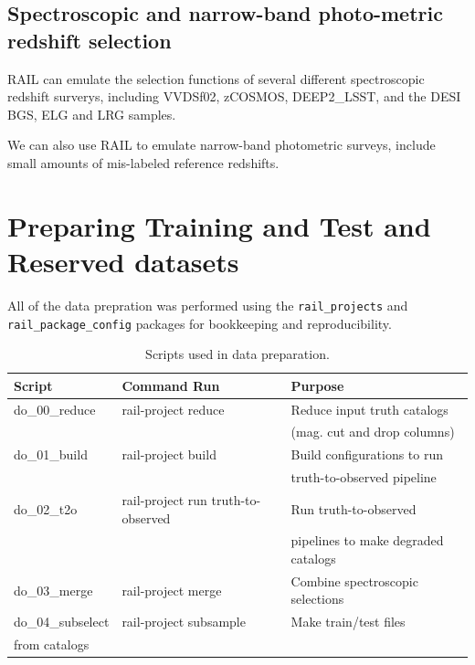 \documentclass[modern]{desc-tex/styles/lsstdescnote}
\begin{document}
\subsection{Spectroscopic and narrow-band photo-metric redshift
  selection}

RAIL can emulate the selection functions of several different
spectroscopic redshift surverys, including VVDSf02, zCOSMOS,
DEEP2\_LSST, and the DESI BGS, ELG and LRG samples.

We can also use RAIL to emulate narrow-band photometric surveys,
include small amounts of mis-labeled reference redshifts.


\section{Preparing Training and Test and Reserved datasets}

All of the data prepration was performed using the
\texttt{rail\_projects} and \texttt{rail\_package\_config} packages
for bookkeeping and reproducibility.

\begin{table}[ht]
\centering
\caption{\label{tab:prep_scripts}\small Scripts used
  in data preparation.}
\begin{tabular}{lll}
\hline \hline
Script & Command Run & Purpose \\ \hline
  do\_00\_reduce & rail-project reduce &  Reduce input truth catalogs \\
  &  &   (mag. cut and drop columns) \\ 
do\_01\_build  & rail-project build & Build configurations to run \\
  &  &   truth-to-observed pipeline \\
do\_02\_t2o & rail-project run truth-to-observed & Run truth-to-observed \\
  &  & pipelines to make degraded catalogs \\ 
do\_03\_merge & rail-project merge &  Combine spectroscopic selections \\
do\_04\_subselect & rail-project subsample &  Make train/test files \\
  from catalogs \\
\hline\hline
\end{tabular}
\end{table}
\end{document}
